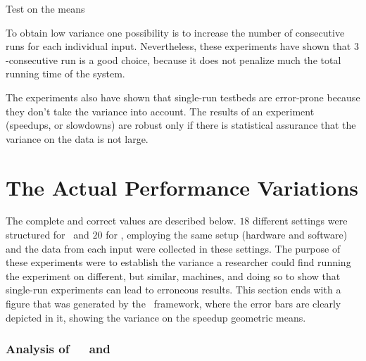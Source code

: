 \begin{table}
  \centering
  \begin{tiny}
  
  \end{tiny}
  \caption{Test on the means}
  \label{tab:statTest}
\end{table}

To obtain low variance one possibility is to increase the number of consecutive runs for each individual input. Nevertheless, these experiments have shown that $3$-consecutive run is a good choice, because it does not penalize much the total running time of the system.

The experiments also have shown that single-run testbeds are error-prone because they don't take the variance into account. The results of an experiment (speedups, or slowdowns) are robust only if there is statistical assurance that the variance on the data is not large.


\section{The Actual Performance Variations}

The complete and correct values are described below. $18$ different settings were structured for \bzip\ and $20$ for \gzip, employing the same setup (hardware and software) and the data from each input were collected in these settings. The purpose of these experiments were to establish the variance a researcher could find running the experiment on different, but similar, machines, and doing so to show that single-run experiments can lead to erroneous results. This section ends with a figure that was generated by the \CP\ framework, where the error bars are clearly depicted in it, showing the variance on the speedup geometric means.

\subsubsection{Analysis of\ \ \bzip\  and  \gzip}

